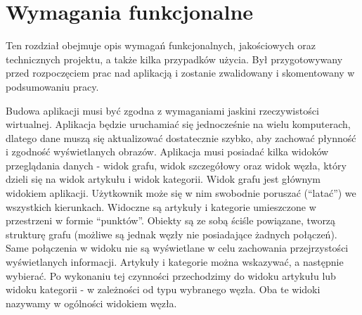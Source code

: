 \section{Wymagania funkcjonalne}
Ten rozdział obejmuje opis wymagań funkcjonalnych, jakościowych oraz technicznych projektu, a także kilka przypadków użycia. Był przygotowywany przed rozpoczęciem prac nad aplikacją i zostanie zwalidowany i skomentowany w podsumowaniu pracy.


Budowa aplikacji musi być zgodna z wymaganiami jaskini rzeczywistości wirtualnej. Aplikacja będzie uruchamiać się jednocześnie na wielu komputerach, dlatego dane muszą się aktualizować dostatecznie szybko, aby zachować płynność i zgodność wyświetlanych obrazów.
Aplikacja musi posiadać kilka widoków przeglądania danych - widok grafu, widok szczegółowy oraz widok węzła, który dzieli się na widok artykułu i widok kategorii. 
Widok grafu jest głównym widokiem aplikacji. Użytkownik może się w nim swobodnie poruszać (“latać”) we wszystkich kierunkach. Widoczne są artykuły i kategorie umieszczone w przestrzeni w formie “punktów”. Obiekty są ze sobą ściśle powiązane, tworzą strukturę grafu (możliwe są jednak węzły nie posiadające żadnych połączeń). Same połączenia w widoku nie są wyświetlane w celu zachowania przejrzystości wyświetlanych informacji. Artykuły i kategorie można wskazywać, a następnie wybierać. Po wykonaniu tej czynności przechodzimy do widoku artykułu lub widoku kategorii - w zależności od typu wybranego węzła. Oba te widoki nazywamy w ogólności widokiem węzła.
